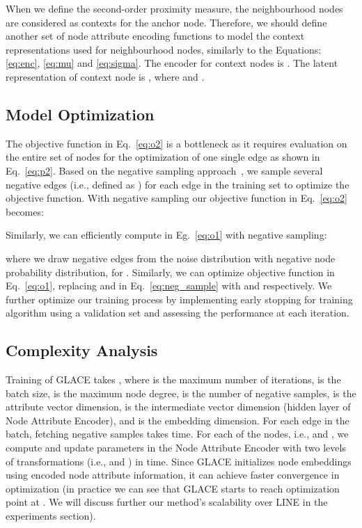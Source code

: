 \documentclass[runningheads]{llncs}
\begin{document}
When we define the second-order proximity measure, the neighbourhood nodes are considered as contexts for the anchor node. Therefore, we should define another set of node attribute encoding functions to model the context representations used for neighbourhood nodes, similarly to the Equations: \ref{eq:enc}, \ref{eq:mu} and \ref{eq:sigma}. The encoder for context nodes is . The latent representation of context node  is , where  and .
{\small
  
}

\subsection{Model Optimization}

The objective function in Eq.~\ref{eq:o2} is a bottleneck as it requires evaluation on the entire set of nodes for the optimization of one single edge as shown in Eq.~\ref{eq:p2}. Based on the negative sampling approach~\cite{mikolov2013distributed,DBLP:line}, we sample several negative edges (i.e., defined as ) for each edge in the training set to optimize the objective function. With negative sampling our objective function  in Eq.~\ref{eq:o2} becomes:
\useshortskip

Similarly, we can efficiently compute  in Eg.~\ref{eq:o1} with negative sampling:
\useshortskip

where we draw negative edges from the noise distribution  with negative node probability distribution,  for . Similarly, we can optimize objective function  in Eq.~\ref{eq:o1}, replacing  and  in Eq.~\ref{eq:neg_sample} with  and  respectively.
We further optimize our training process by implementing early stopping for training algorithm using a validation set and assessing the performance at each iteration. 

\subsection{Complexity Analysis}

Training of GLACE takes , where  is the maximum number of iterations,  is the batch size,  is the maximum node degree,  is the number of negative samples,  is the attribute vector dimension,  is the intermediate vector dimension (hidden layer of Node Attribute Encoder), and  is the embedding dimension. For each edge in the batch, fetching  negative samples takes  time. For each of the  nodes, i.e.,  and , we compute and update parameters in the Node Attribute Encoder with two levels of transformations (i.e.,  and ) in  time. 
Since GLACE initializes node embeddings using encoded node attribute information, it can achieve faster convergence in optimization (in practice we can see that GLACE starts to reach optimization point at . We will discuss further our method's scalability over LINE in the experiments section). 
\end{document}
